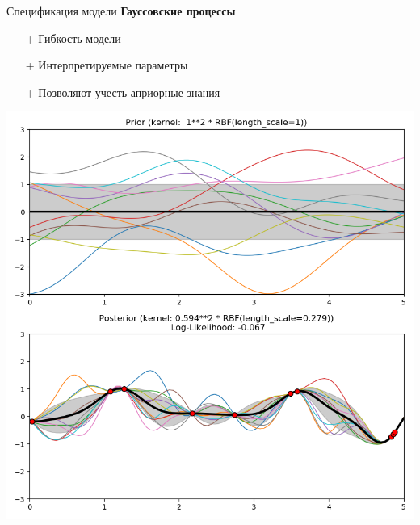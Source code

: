 \documentclass[14pt]{beamer}
\begin{document}
\begin{frame}{Спецификация модели}
\textbf{Гауссовские процессы}

\begin{minipage}{.5\linewidth}
\begin{itemize}
	\item[+] Гибкость модели
	\item[+] Интерпретируемые параметры
	\item[+] Позволяют учесть априорные знания
\end{itemize}
\end{minipage}
\begin{minipage}{.48\linewidth}
	\includegraphics[width=\linewidth]{sampleGP}
\end{minipage}
\end{frame}
\end{document}
